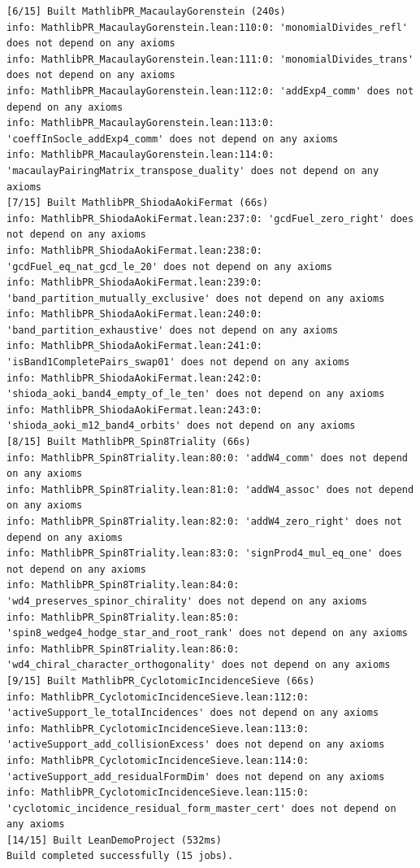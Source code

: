 \documentclass[11pt,a4paper]{article}
\begin{document}
\begin{lstlisting}[language={},basicstyle=\ttfamily\scriptsize,caption={Raw \texttt{lake clean \&\& lake build} and \texttt{\#print axioms} output for all 23 theorems across the four \texttt{MathlibPR\_*} modules.}]
[6/15] Built MathlibPR_MacaulayGorenstein (240s)
info: MathlibPR_MacaulayGorenstein.lean:110:0: 'monomialDivides_refl' does not depend on any axioms
info: MathlibPR_MacaulayGorenstein.lean:111:0: 'monomialDivides_trans' does not depend on any axioms
info: MathlibPR_MacaulayGorenstein.lean:112:0: 'addExp4_comm' does not depend on any axioms
info: MathlibPR_MacaulayGorenstein.lean:113:0: 'coeffInSocle_addExp4_comm' does not depend on any axioms
info: MathlibPR_MacaulayGorenstein.lean:114:0: 'macaulayPairingMatrix_transpose_duality' does not depend on any axioms
[7/15] Built MathlibPR_ShiodaAokiFermat (66s)
info: MathlibPR_ShiodaAokiFermat.lean:237:0: 'gcdFuel_zero_right' does not depend on any axioms
info: MathlibPR_ShiodaAokiFermat.lean:238:0: 'gcdFuel_eq_nat_gcd_le_20' does not depend on any axioms
info: MathlibPR_ShiodaAokiFermat.lean:239:0: 'band_partition_mutually_exclusive' does not depend on any axioms
info: MathlibPR_ShiodaAokiFermat.lean:240:0: 'band_partition_exhaustive' does not depend on any axioms
info: MathlibPR_ShiodaAokiFermat.lean:241:0: 'isBand1CompletePairs_swap01' does not depend on any axioms
info: MathlibPR_ShiodaAokiFermat.lean:242:0: 'shioda_aoki_band4_empty_of_le_ten' does not depend on any axioms
info: MathlibPR_ShiodaAokiFermat.lean:243:0: 'shioda_aoki_m12_band4_orbits' does not depend on any axioms
[8/15] Built MathlibPR_Spin8Triality (66s)
info: MathlibPR_Spin8Triality.lean:80:0: 'addW4_comm' does not depend on any axioms
info: MathlibPR_Spin8Triality.lean:81:0: 'addW4_assoc' does not depend on any axioms
info: MathlibPR_Spin8Triality.lean:82:0: 'addW4_zero_right' does not depend on any axioms
info: MathlibPR_Spin8Triality.lean:83:0: 'signProd4_mul_eq_one' does not depend on any axioms
info: MathlibPR_Spin8Triality.lean:84:0: 'wd4_preserves_spinor_chirality' does not depend on any axioms
info: MathlibPR_Spin8Triality.lean:85:0: 'spin8_wedge4_hodge_star_and_root_rank' does not depend on any axioms
info: MathlibPR_Spin8Triality.lean:86:0: 'wd4_chiral_character_orthogonality' does not depend on any axioms
[9/15] Built MathlibPR_CyclotomicIncidenceSieve (66s)
info: MathlibPR_CyclotomicIncidenceSieve.lean:112:0: 'activeSupport_le_totalIncidences' does not depend on any axioms
info: MathlibPR_CyclotomicIncidenceSieve.lean:113:0: 'activeSupport_add_collisionExcess' does not depend on any axioms
info: MathlibPR_CyclotomicIncidenceSieve.lean:114:0: 'activeSupport_add_residualFormDim' does not depend on any axioms
info: MathlibPR_CyclotomicIncidenceSieve.lean:115:0: 'cyclotomic_incidence_residual_form_master_cert' does not depend on any axioms
[14/15] Built LeanDemoProject (532ms)
Build completed successfully (15 jobs).
\end{lstlisting}
\end{document}
